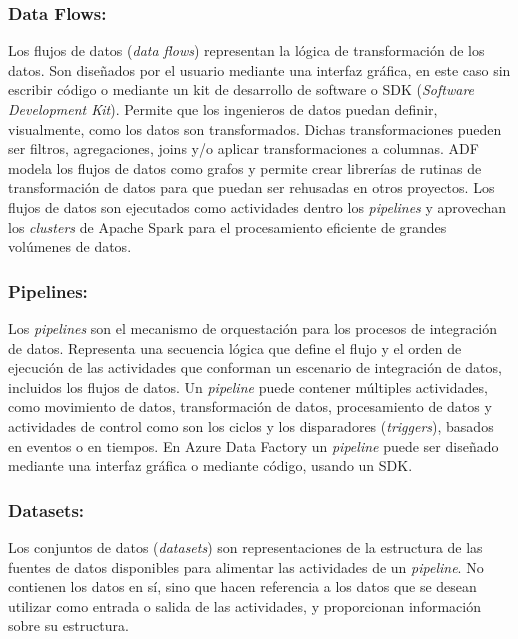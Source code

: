 \subsubsection{Data Flows:}

Los flujos de datos (\emph{data flows}) representan la lógica de transformación de los datos. Son diseñados por el usuario 
mediante una interfaz gráfica, en este caso sin escribir código o mediante un kit de desarrollo de software o SDK (\emph{Software Development Kit}). 
Permite que los ingenieros de 
datos puedan definir, visualmente, como los datos son transformados. Dichas transformaciones pueden ser filtros, 
agregaciones, joins y/o aplicar transformaciones a columnas. ADF modela los flujos de datos como grafos y permite crear 
librerías de rutinas de transformaci\'on de datos para que puedan ser rehusadas en otros proyectos. Los flujos de datos 
son ejecutados como actividades dentro los \emph{pipelines} y aprovechan los \emph{clusters} de Apache Spark para el procesamiento 
eficiente de grandes volúmenes de datos. 


\subsubsection{Pipelines:}

Los \emph{pipelines} son el mecanismo de orquestación para los procesos de integración de datos. Representa una secuencia 
lógica que define el flujo y el orden de ejecución de las actividades que conforman un escenario de integración de datos, 
incluidos los flujos de datos. Un \emph{pipeline} puede contener múltiples actividades, como movimiento de datos, 
transformación de datos, procesamiento de datos y actividades de control como son los ciclos y los 
disparadores (\emph{triggers}), basados en eventos o en tiempos. En Azure Data Factory un \emph{pipeline} puede ser diseñado 
mediante una interfaz gr\'afica o mediante c\'odigo, usando un SDK.

\subsubsection{Datasets:}

Los conjuntos de datos (\emph{datasets}) son representaciones de la estructura de las fuentes de datos disponibles para 
alimentar las actividades de un \emph{pipeline}. No contienen los datos en sí, sino que hacen referencia a los datos que se 
desean utilizar como entrada o salida de las actividades, y proporcionan información sobre su estructura.

